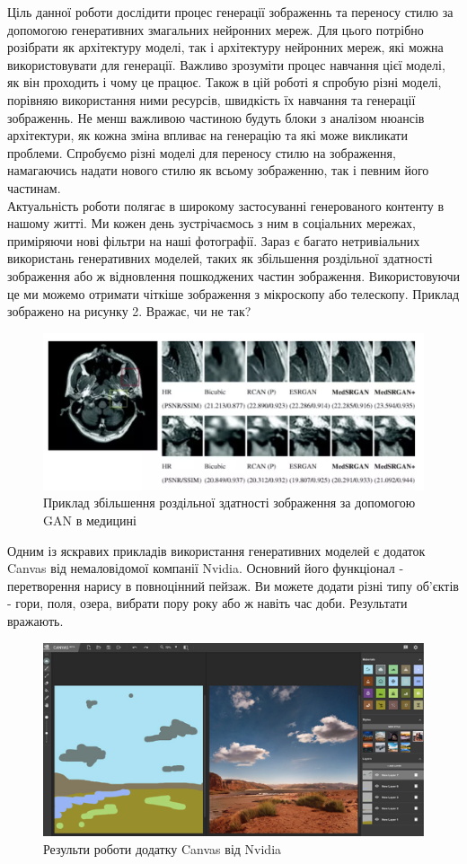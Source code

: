 \documentclass{article}
\begin{document}
	\null\quad Ціль данної роботи дослідити процес генерації зображеннь та переносу стилю за допомогою генеративних змагальних нейронних мереж. Для цього потрібно розібрати як архітектуру моделі, так і архітектуру нейронних мереж, які можна використовувати для генерації. Важливо зрозуміти процес навчання цієї моделі, як він проходить і чому це працює. Також в цій роботі я спробую різні моделі, порівняю використання ними ресурсів, швидкість їх навчання та генерації зображеннь. Не менш важливою частиною будуть блоки з аналізом нюансів архітектури, як кожна зміна впливає на генерацію та які може викликати проблеми. Спробуємо різні моделі для переносу стилю на зображення, намагаючись надати нового стилю як всьому зображенню, так і певним його частинам. \\
	\null\quad Актуальність роботи полягає в широкому застосуванні генерованого контенту в нашому житті. Ми кожен день зустрічаємось з ним в соціальних мережах, приміряючи нові фільтри на наші фотографії. Зараз є багато нетривіальних використань генеративних моделей, таких як збільшення роздільної здатності зображення або ж відновлення пошкоджених частин зображення. Використовуючи це ми можемо отримати чіткіше зображення з мікроскопу або телескопу. Приклад зображено на рисунку 2. Вражає, чи не так?
	\begin{figure}[H]
		\centering
		\includegraphics[scale=0.4]{medicine.png}
		\caption{Приклад збільшення роздільної здатності зображення за допомогою GAN в медицині}
	\end{figure} 
	\null\quad Одним із яскравих прикладів використання генеративних моделей є додаток Canvas від немаловідомої компанії Nvidia. Основний його функціонал - перетворення нарису в повноцінний пейзаж. Ви можете додати різні типу об'єктів - гори, поля, озера, вибрати пору року або ж навіть час доби. Результати вражають.
	\begin{figure}[H]
		\centering
		\includegraphics[scale=0.3]{nvidia_canvas.png}
		\caption{Результи роботи додатку Canvas від Nvidia}
	\end{figure} 
\end{document}
